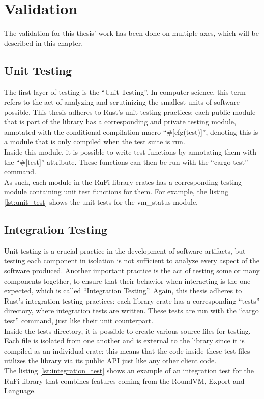 
\chapter{Validation}
\label{chap:validation}

The validation for this thesis' work has been done on multiple axes, which will be described in this chapter.

\section{Unit Testing}
The first layer of testing is the ``Unit Testing''. In computer science, this term refers to the act of analyzing and scrutinizing the smallest units of software possible.
This thesis adheres to Rust's unit testing practices: each public module that is part of the library has a corresponding and private testing module, annotated with the
conditional compilation macro ``\#[cfg(test)]'', denoting this is a module that is only compiled when the test suite is run.\\
Inside this module, it is possible to write test functions by annotating them with the ``\#[test]'' attribute. These functions can then be run with the ``cargo test'' command.\\
As such, each module in the RuFi library crates has a corresponding testing module containing unit test functions for them. For example, the listing \ref{lst:unit_test} shows the unit tests for the
vm\_status module.



\section{Integration Testing}
Unit testing is a crucial practice in the development of software artifacts, but testing each component in isolation is not sufficient to analyze every aspect of the software produced.
Another important practice is the act of testing some or many components together, to ensure that their behavior when interacting is the one expected, which is called ``Integration Testing''.
Again, this thesis adheres to Rust's integration testing practices: each library crate has a corresponding ``tests'' directory, where integration tests are written. These tests are run with the ``cargo test'' command, just like their unit counterpart.\\
Inside the tests directory, it is possible to create various source files for testing. Each file is isolated from one another and is external to the library since it is compiled as an individual crate: this means that the
code inside these test files utilizes the library via its public API just like any other client code.\\
The listing \ref{lst:integration_test} shows an example of an integration test for the RuFi library that combines features coming from the RoundVM, Export and Language.

